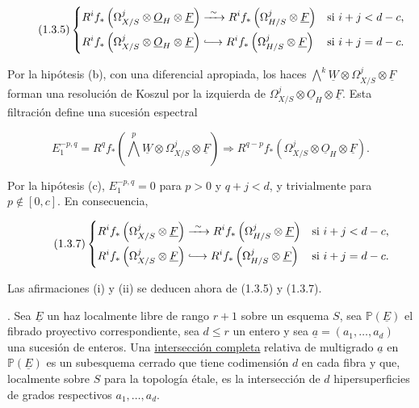 \begin{equation}\tag{1.3.5}
\left\{
\begin{aligned}
R^if_*\left(\Omega^j_{X/S}\otimes\underline O_H\otimes\underline F\right)
&\xrightarrow{\ \sim\ }
R^if_*\left(\Omega^j_{H/S}\otimes\underline F\right)
&&\text{si }i+j<d-c,\\
R^if_*\left(\Omega^j_{X/S}\otimes\underline O_H\otimes\underline F\right)
&\lhook\joinrel\longrightarrow
R^if_*\left(\Omega^j_{H/S}\otimes\underline F\right)
&&\text{si }i+j=d-c.
\end{aligned}
\right.
\end{equation}

Por la hipótesis (b), con una diferencial apropiada, los haces
$\bigwedge^k\underline W\otimes\Omega^j_{X/S}\otimes\underline F$ forman
una resolución de Koszul por la izquierda de
$\Omega^j_{X/S}\otimes\underline O_H\otimes\underline F$. Esta filtración
define una sucesión espectral

\begin{equation}\tag{1.3.6}
E_1^{-p,q}=R^qf_*\left(\bigwedge^p\underline W\otimes
\Omega^j_{X/S}\otimes\underline F\right)
\Longrightarrow
R^{q-p}f_*\left(\Omega^j_{X/S}\otimes\underline O_H
\otimes\underline F\right).
\end{equation}

Por la hipótesis (c), $E_1^{-p,q}=0$ para $p>0$ y $q+j<d$, y trivialmente
para $p\notin[0,c]$. En consecuencia,

\begin{equation}\tag{1.3.7}
\left\{
\begin{aligned}
R^if_*\left(\Omega^j_{X/S}\otimes\underline F\right)
&\xrightarrow{\ \sim\ }
R^if_*\left(\Omega^j_{H/S}\otimes\underline F\right)
&&\text{si }i+j<d-c,\\
R^if_*\left(\Omega^j_{X/S}\otimes\underline F\right)
&\lhook\joinrel\longrightarrow
R^if_*\left(\Omega^j_{H/S}\otimes\underline F\right)
&&\text{si }i+j=d-c.
\end{aligned}
\right.
\end{equation}

Las afirmaciones (i) y (ii) se deducen ahora de (1.3.5) y (1.3.7).

\pageoriginale

\medskip
{}. Sea $\underline E$ un haz localmente libre de rango $r+1$
sobre un esquema $S$, sea $\mathbb P(\underline E)$ el fibrado proyectivo
correspondiente, sea $d\leq r$ un entero y sea
$\underline a=(a_1,\ldots,a_d)$ una sucesión de enteros. Una
\underline{intersección completa} relativa de multigrado $\underline a$
en $\mathbb P(\underline E)$ es un subesquema cerrado que tiene codimensión
$d$ en cada fibra y que, localmente sobre $S$ para la topología étale, es la
intersección de $d$ hipersuperficies de grados respectivos
$a_1,\ldots,a_d$.

